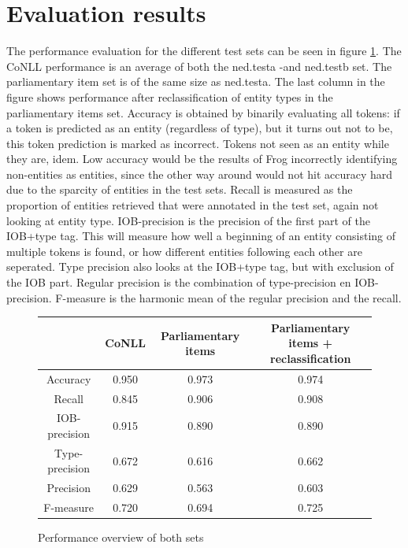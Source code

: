 \section{Evaluation results}
\label{sec:eva}
The performance evaluation for the different test sets can be seen in figure \ref{fig:performance}. The CoNLL performance is an average of both the ned.testa -and ned.testb set. The parliamentary item set is of the same size as ned.testa. The last column in the figure shows performance after reclassification of entity types in the parliamentary items set. Accuracy is obtained by binarily evaluating all tokens: if a token is predicted as an entity (regardless of type), but it turns out not to be, this token prediction is marked as incorrect. Tokens not seen as an entity while they are, idem. Low accuracy would be the results of Frog incorrectly identifying non-entities as entities, since the other way around would not hit accuracy hard due to the sparcity of entities in the test sets. Recall is measured as the proportion of entities retrieved that were annotated in the test set, again not looking at entity type. IOB-precision is the precision of the first part of the IOB+type tag. This will measure how well a beginning of an entity consisting of multiple tokens is found, or how different entities following each other are seperated. Type precision also looks at the IOB+type tag, but with exclusion of the IOB part. Regular precision is the combination of type-precision en IOB-precision. F-measure is the harmonic mean of the regular precision and the recall.

\begin{figure}
\begin{tabular}{c||c|c|c|}
     & \textbf{CoNLL} & \textbf{Parliamentary items} & \textbf{Parliamentary items + reclassification} \\\hline \hline
Accuracy & 0.950 & 0.973 & 0.974 \\\hline
Recall & 0.845 & 0.906 & 0.908\\\hline 
IOB-precision & 0.915 & 0.890 & 0.890 \\\hline 
Type-precision & 0.672 & 0.616 & 0.662\\\hline 
Precision & 0.629 & 0.563 & 0.603\\\hline
F-measure & 0.720 & 0.694 & 0.725\\\hline
 \end{tabular}
\caption{Performance overview of both sets}
\label{fig:performance}
\end{figure}

